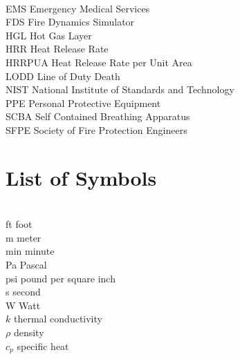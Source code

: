 \documentclass[12pt,oneside]{book}
\begin{document}
\begin{tabbing}
\hspace{1.5in} \= \\
EMS \> Emergency Medical Services \\
FDS \> Fire Dynamics Simulator \\
HGL \> Hot Gas Layer \\
HRR \> Heat Release Rate \\
HRRPUA \> Heat Release Rate per Unit Area \\
LODD \> Line of Duty Death \\
NIST \> National Institute of Standards and Technology \\
PPE \> Personal Protective Equipment \\
SCBA \> Self Contained Breathing Apparatus \\
SFPE \> Society of Fire Protection Engineers \\
\end{tabbing}

\chapter{List of Symbols}

\begin{tabbing}
\hspace{1.5in} \= \\
ft \> foot \\
m \> meter \\
min \> minute \\
Pa \> Pascal \\
psi \> pound per square inch \\
s \> second \\
W \> Watt \\
$k$ \> thermal conductivity \\
$\rho$ \> density \\
$c_{p}$ \> specific heat \\
\end{tabbing}

\mainmatter
\end{document}
